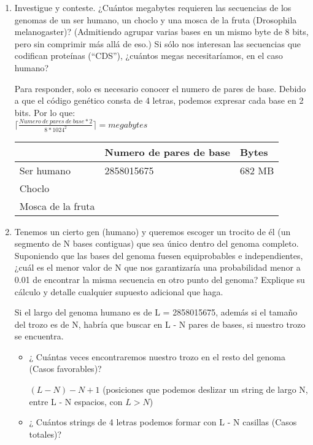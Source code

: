\begin{enumerate}
\item Investigue y conteste. ¿Cuántos megabytes requieren las secuencias de los genomas de un ser
humano, un choclo y una mosca de la fruta (Drosophila melanogaster)? (Admitiendo agrupar varias
bases en un mismo byte de 8 bits, pero sin comprimir más allá de eso.) Si sólo nos interesan las
secuencias que codifican proteínas (“CDS”), ¿cuántos megas necesitaríamos, en el caso humano?

Para responder, solo es necesario conocer el numero de pares de base. Debido a que el código genético
consta de 4 letras, podemos expresar cada base en 2 bits. Por lo que: \\

$ \lceil \frac{Numero \ de \ pares \ de \ base * 2}{8 * 1024^2} \rceil = megabytes$ \\

\begin{tabular}{|l|l|l|}
\hline
 & Numero de pares de base & Bytes \\
\hline
Ser humano & 2858015675 & 682 MB\\
Choclo & & \\
Mosca de la fruta & & \\
\hline
\end{tabular}


\item Tenemos un cierto gen (humano) y queremos escoger un trocito de él (un segmento de N bases
contiguas) que sea único dentro del genoma completo. Suponiendo que las bases del genoma fuesen
equiprobables e independientes, ¿cuál es el menor valor de N que nos garantizaría una probabilidad
menor a 0.01 de encontrar la misma secuencia en otro punto del genoma? Explique su cálculo y detalle
cualquier supuesto adicional que haga.

Si el largo del genoma humano es de L = 2858015675, además si el tamaño del trozo es de N, habría que buscar en
L - N pares de bases, si nuestro trozo se encuentra.\\

\begin{itemize}

\item ¿ Cuántas veces encontraremos nuestro trozo en el resto del genoma (Casos favorables)?

$(L - N) - N + 1$ (posiciones que podemos deslizar un string de largo N, entre L - N espacios, con $L > N$)

\item ¿ Cuántos strings de 4 letras podemos formar con L - N casillas (Casos totales)?


\end{itemize}
\end{enumerate}
